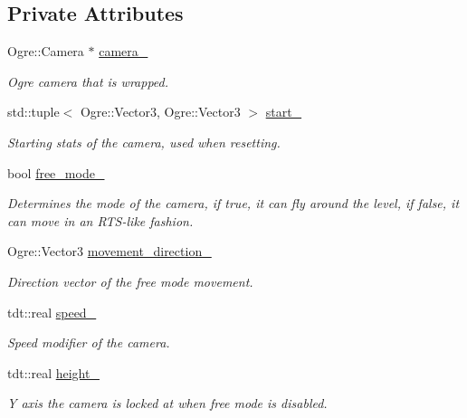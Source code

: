 \subsection*{Private Attributes}
\begin{DoxyCompactItemize}
\item 
Ogre\+::\+Camera $\ast$ \hyperlink{class_camera_a03027c3c0af67ea450e4df182d3ade68}{camera\+\_\+}
\begin{DoxyCompactList}\small\item\em Ogre camera that is wrapped. \end{DoxyCompactList}\item 
std\+::tuple$<$ Ogre\+::\+Vector3, Ogre\+::\+Vector3 $>$ \hyperlink{class_camera_a050ad880982ac8d843b1b66dd6431170}{start\+\_\+}
\begin{DoxyCompactList}\small\item\em Starting stats of the camera, used when resetting. \end{DoxyCompactList}\item 
bool \hyperlink{class_camera_ab9e64d468f4bdc04492a6a326c8dc2ff}{free\+\_\+mode\+\_\+}
\begin{DoxyCompactList}\small\item\em Determines the mode of the camera, if true, it can fly around the level, if false, it can move in an R\+T\+S-\/like fashion. \end{DoxyCompactList}\item 
Ogre\+::\+Vector3 \hyperlink{class_camera_aa3b2cb044a4fd23eb8b3426e10ad0393}{movement\+\_\+direction\+\_\+}
\begin{DoxyCompactList}\small\item\em Direction vector of the free mode movement. \end{DoxyCompactList}\item 
tdt\+::real \hyperlink{class_camera_a08f8fa9c6bf80dcafe14d54787300ade}{speed\+\_\+}
\begin{DoxyCompactList}\small\item\em Speed modifier of the camera. \end{DoxyCompactList}\item 
tdt\+::real \hyperlink{class_camera_ab1238ca5c0a615278712ff93c50c095b}{height\+\_\+}
\begin{DoxyCompactList}\small\item\em Y axis the camera is locked at when free mode is disabled. \end{DoxyCompactList}\end{DoxyCompactItemize}
